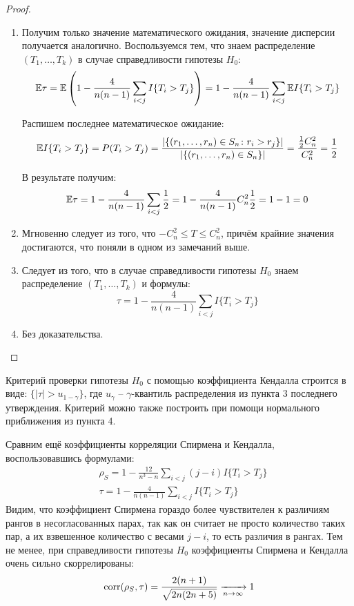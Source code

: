 \begin{proof}~
    \begin{enumerate}
        \item Получим только значение математического ожидания, значение дисперсии получается аналогично. Воспользуемся тем, что знаем распределение $(T_1, \dots, T_k)$ в случае справедливости гипотезы $H_0$:
        \[
            \mathbb{E} \tau = \mathbb{E} \left(1 - \frac{4}{n(n-1)} \sum_{i < j} I\{T_i > T_j\}\right) = 1 - \frac{4}{n(n-1)} \sum_{i < j} \mathbb{E} I\{T_i > T_j\}
        \]

        Распишем последнее математическое ожидание:
        \[
            \mathbb{E} I\{T_i > T_j\} = P(T_i > T_j) = \frac{|\{(r_1, \dots, r_n) \in S_n \colon r_i > r_j\}|}{|\{(r_1, \dots, r_n) \in S_n\}|} = \frac{\frac{1}{2} C_n^2}{C_n^2} = \frac{1}{2}
        \]

        В результате получим:
        \[
            \mathbb{E} \tau = 1 - \frac{4}{n(n-1)} \sum_{i < j} \frac{1}{2} = 1 - \frac{4}{n(n-1)} C_n^2 \frac{1}{2} = 1 - 1 = 0
        \]

        \item Мгновенно следует из того, что $-C_n^2 \le T \le C_n^2$, причём крайние значения достигаются, что поняли в одном из замечаний выше.

        \item Следует из того, что в случае справедливости гипотезы $H_0$ знаем распределение $(T_1, \dots, T_k)$ и формулы:
        \[
            \tau = 1 - \frac{4}{n(n-1)} \sum_{i < j} I\{T_i > T_j\}
        \]

        \item Без доказательства.
    \end{enumerate}
\end{proof}

\begin{note}
    Критерий проверки гипотезы $H_0$ с помощью коэффициента Кендалла строится в виде: $\{|\tau| > u_{1-\gamma}\}$, где $u_\gamma$ -- $\gamma$-квантиль распределения из пункта 3 последнего утверждения. Критерий можно также построить при помощи нормального приближения из пункта 4.
\end{note}

\begin{note}
    Сравним ещё коэффициенты корреляции Спирмена и Кендалла, воспользовавшись формулами:
    \begin{align*}
        & \rho_S = 1 - \frac{12}{n^3-n} \sum\limits_{i<j} (j-i) I\{T_i > T_j\}
        \\
        & \tau = 1 - \frac{4}{n(n-1)} \sum_{i < j} I\{T_i > T_j\}
    \end{align*}
    Видим, что коэффициент Спирмена гораздо более чувствителен к различиям рангов в несогласованных парах, так как он считает не просто количество таких пар, а их взвешенное количество с весами $j-i$, то есть различия в рангах. Тем не менее, при справедливости гипотезы $H_0$ коэффициенты Спирмена и Кендалла очень сильно скоррелированы:
    \[
        \operatorname{corr}(\rho_S, \tau) = \frac{2(n+1)}{\sqrt{2n(2n+5)}} \xrightarrow[n \to \infty]{} 1
    \]
\end{note}